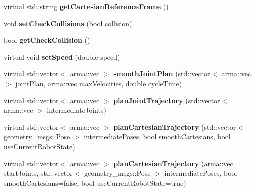 \begin{DoxyCompactItemize}
\item 
virtual std\+::string {\bfseries get\+Cartesian\+Reference\+Frame} ()\hypertarget{classkukadu_1_1CachedPlanner_a836c9f6f1ab03859e4348243d44e71a2}{}\label{classkukadu_1_1CachedPlanner_a836c9f6f1ab03859e4348243d44e71a2}

\item 
void {\bfseries set\+Check\+Collisions} (bool collision)\hypertarget{classkukadu_1_1CachedPlanner_a0138d95efdd1741168de95f5cdaace35}{}\label{classkukadu_1_1CachedPlanner_a0138d95efdd1741168de95f5cdaace35}

\item 
bool {\bfseries get\+Check\+Collision} ()\hypertarget{classkukadu_1_1CachedPlanner_aa26b96b8e0dbd4190c6126aa417e6b73}{}\label{classkukadu_1_1CachedPlanner_aa26b96b8e0dbd4190c6126aa417e6b73}

\item 
virtual void {\bfseries set\+Speed} (double speed)\hypertarget{classkukadu_1_1CachedPlanner_ad1e90b2f4b34e83a8c04644fa4d676a3}{}\label{classkukadu_1_1CachedPlanner_ad1e90b2f4b34e83a8c04644fa4d676a3}

\item 
virtual std\+::vector$<$ arma\+::vec $>$ {\bfseries smooth\+Joint\+Plan} (std\+::vector$<$ arma\+::vec $>$ joint\+Plan, arma\+::vec max\+Velocities, double cycle\+Time)\hypertarget{classkukadu_1_1CachedPlanner_ad09864c1ca8950ecc3dbf2170772f074}{}\label{classkukadu_1_1CachedPlanner_ad09864c1ca8950ecc3dbf2170772f074}

\item 
virtual std\+::vector$<$ arma\+::vec $>$ {\bfseries plan\+Joint\+Trajectory} (std\+::vector$<$ arma\+::vec $>$ intermediate\+Joints)\hypertarget{classkukadu_1_1CachedPlanner_a371489e4e0ff35a1a832aed99dea7f79}{}\label{classkukadu_1_1CachedPlanner_a371489e4e0ff35a1a832aed99dea7f79}

\item 
virtual std\+::vector$<$ arma\+::vec $>$ {\bfseries plan\+Cartesian\+Trajectory} (std\+::vector$<$ geometry\+\_\+msgs\+::\+Pose $>$ intermediate\+Poses, bool smooth\+Cartesians, bool use\+Current\+Robot\+State)\hypertarget{classkukadu_1_1CachedPlanner_a9f818e9573e71ac96cb057e43c42390e}{}\label{classkukadu_1_1CachedPlanner_a9f818e9573e71ac96cb057e43c42390e}

\item 
virtual std\+::vector$<$ arma\+::vec $>$ {\bfseries plan\+Cartesian\+Trajectory} (arma\+::vec start\+Joints, std\+::vector$<$ geometry\+\_\+msgs\+::\+Pose $>$ intermediate\+Poses, bool smooth\+Cartesians=false, bool use\+Current\+Robot\+State=true)\hypertarget{classkukadu_1_1CachedPlanner_af918e17fb32fb725d11d8f8083b019d3}{}\label{classkukadu_1_1CachedPlanner_af918e17fb32fb725d11d8f8083b019d3}

\end{DoxyCompactItemize}
